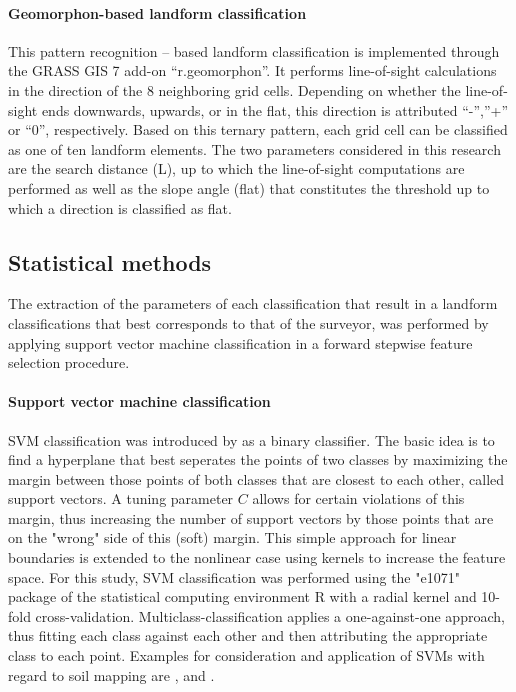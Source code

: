 \documentclass[final,1p,times,twocolumn,authoryear]{elsarticle}
\begin{document}
\paragraph{Geomorphon-based landform classification \cite{Jasiewicz2013}}
This pattern recognition – based landform classification is implemented through the GRASS GIS 7 add-on “r.geomorphon”. It performs line-of-sight calculations in the direction of the 8 neighboring grid cells.  Depending on whether the line-of-sight ends downwards,  upwards, or in the flat, this direction is attributed “-”,”+” or “0”, respectively.  Based on this ternary pattern, each grid cell can be classified as one of ten landform elements. The two parameters considered in this research are the search distance (L), up to which the line-of-sight computations are performed as well as the slope angle (flat) that constitutes the threshold up to which a direction is classified as flat. 

\subsection{Statistical methods}
The extraction of the parameters of each classification that result in a landform classifications that best corresponds to that of the surveyor, was performed by applying support vector machine classification in a forward stepwise feature selection procedure.
\paragraph{Support vector machine classification}
SVM classification was introduced by \cite{Cortes1995} as a binary classifier. The basic idea is to find a hyperplane that best seperates the points of two classes by maximizing the margin between those points of both classes that are closest to each other, called support vectors. A tuning parameter $C$ allows for certain violations of this margin, thus increasing the number of support vectors by those points that are on the "wrong" side of this (soft) margin. This simple approach for linear boundaries is extended to the nonlinear case using kernels to increase the feature space. For this study, SVM classification was performed using the "e1071" package \citep{meyer2014} of the statistical computing environment R \citep{cran2014} with a radial kernel and 10-fold cross-validation. Multiclass-classification applies a one-against-one approach, thus fitting each class against each other and then attributing the appropriate class to each point. Examples for consideration and application of SVMs with regard to soil mapping are \cite{Ballabio2009}, \cite{Behrens2006} and \cite{Rossel2010}.
\end{document}
